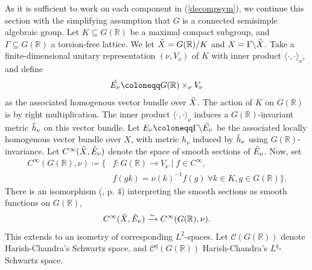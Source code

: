 \documentclass[11pt,reqno]{amsart}
\numberwithin{equation}{section}
\theoremstyle{definition}
\theoremstyle{remark}
\newcommand{\R}{\mathbb{R}}
\renewcommand{\subset}{\subseteq}
\begin{document}
As it is sufficient to work on each component in (\ref{decompsym}), we continue this section with the simplifying assumption that $G$ is a connected semisimple algebraic group. Let $K\subset G(\R)$ be a maximal compact subgroup, and $\Gamma\subset G(\R)$ a torsion-free lattice. We let $\Tilde{X}=G(\R)/K$ and $X=\Gamma\backslash \Tilde{X}$. Take a finite-dimensional unitary representation $(\nu,V_\nu)$ of $K$ with inner product $\langle\cdot,\cdot\rangle_\nu$, and define
\begin{align*}
    \Tilde{E_\nu} \coloneqq G(\R)\times_\nu V_\nu
\end{align*}
as the associated homogenous vector bundle over $\Tilde{X}$. The action of $K$ on $G(\R)$ is by right multiplication. The inner product $\langle\cdot,\cdot\rangle_\nu$ induces a $G(\R)$-invariant metric $\Tilde{h}_\nu$ on this vector bundle. %
Let $E_\nu\coloneqq \Gamma\backslash\Tilde{E_\nu}$ be the associated locally homogenous vector bundle over $X$, with metric $h_\nu$ induced by $\Tilde{h}_\nu$ using $G(\R)$-invariance. %
Let $C^\infty(\Tilde{X},\Tilde{E}_\nu)$ denote the space of smooth sections of $\Tilde{E}_\nu$. Now, set
\begin{align*}
    C^\infty(G(\R),\nu) \coloneqq \lbrace &f:G(\R)\to V_\nu \mid f\in C^\infty,\\
    &f(gk) = \nu(k)^{-1}f(g) \:\forall k\in K,g\in G(\R)\rbrace.
\end{align*}
There is an isomorphism (\cite{Miatello}, p. 4) interpreting the smooth sections as smooth functions on $G(\R)$,
\begin{align}\label{c-inf spaces}
    C^\infty(\Tilde{X},\Tilde{E}_\nu) \xrightarrow{\sim} C^\infty(G(\R),\nu).
\end{align}
\noindent This extends to an isometry of corresponding $L^2$-spaces. Let $\mathcal{C}(G(\R))$ denote Harish-Chandra's Schwartz space, and $\mathcal{C}^q(G(\R))$ Harish-Chandra's $L^q$-Schwartz space. 
\end{document}
